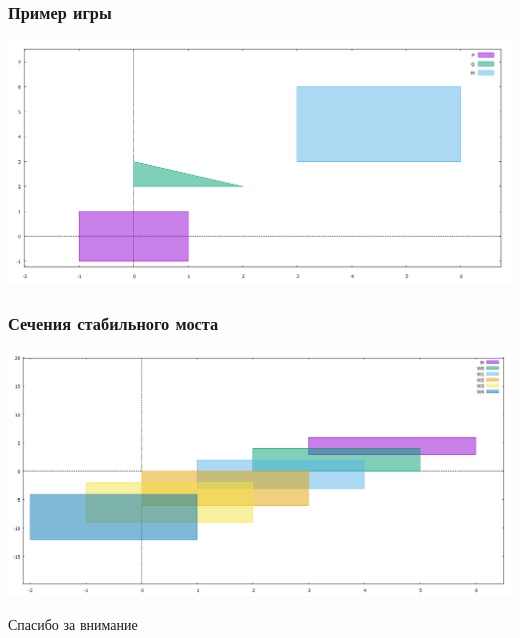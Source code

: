 \documentclass{beamer}
\begin{document}
  
  \begin{frame}
    \frametitle{Пример игры}
  
    \includegraphics[width=1.0\textwidth]{game}

  \end{frame}
  

  \begin{frame}
    \frametitle{Сечения стабильного моста}
  
    \includegraphics[width=1.0\textwidth]{bridge}
    
  \end{frame}

  \begin{frame}
  \Huge{\centerline{Спасибо за внимание}}
  \end{frame}
  
  
  
\end{document}
